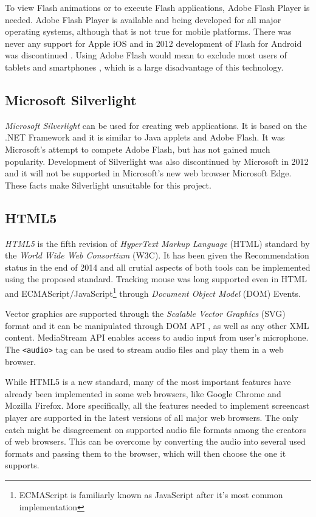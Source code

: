 To view Flash animations or to execute Flash applications, Adobe Flash Player is needed. Adobe Flash Player is available and being developed for all major operating systems, although that is not true for mobile platforms. There was never any support for Apple iOS \cite{steve_jobs} and in 2012 development of Flash for Android was discontinued \cite{flash_mobile}. Using Adobe Flash would mean to exclude most users of tablets and smartphones \cite{mobile_statistics}, which is a large disadvantage of this technology.

\subsection{Microsoft Silverlight}
\textit{Microsoft Silverlight} \cite{silverlight} can be used for creating web applications. It is based on the .NET Framework and it is similar to Java applets and Adobe Flash. It was Microsoft's attempt to compete Adobe Flash, but has not gained much popularity. Development of Silverlight was also discontinued by Microsoft in 2012 and it will not be supported in Microsoft's new web browser Microsoft Edge\cite{silverlight_is_dead}. These facts make Silverlight unsuitable for this project.


\subsection{HTML5}
\textit{HTML5} is the fifth revision of \textit{HyperText Markup Language} (HTML) standard by the \textit{World Wide Web Consortium} (W3C). It has been given the Recommendation status in the end of 2014 and all crutial aspects of both tools can be implemented using the proposed standard. Tracking mouse was long supported even in HTML and ECMAScript/JavaScript\footnote{ECMAScript is familiarly known as JavaScript after it's most common implementation\cite{javascript_vs_ecmascript}} through \textit{Document Object Model} (DOM) Events\cite{dom_mouse_events}.

Vector graphics are supported through the \textit{Scalable Vector Graphics} (SVG) format \cite{svg} and it can be manipulated through DOM API \cite{dom}, as well as any other XML content. MediaStream API \cite{} enables access to audio input from user's microphone. The \verb|<audio>| tag can be used to stream audio files and play them in a web browser.

While HTML5 is a new standard, many of the most important features have already been implemented in some web browsers, like Google Chrome and Mozilla Firefox. More specifically, all the features needed to implement screencast player are supported in the latest versions of all major web browsers. The only catch might be disagreement on supported audio file formats among the creators of web browsers. This can be overcome by converting the audio into several used formats and passing them to the browser, which will then choose the one it supports.

